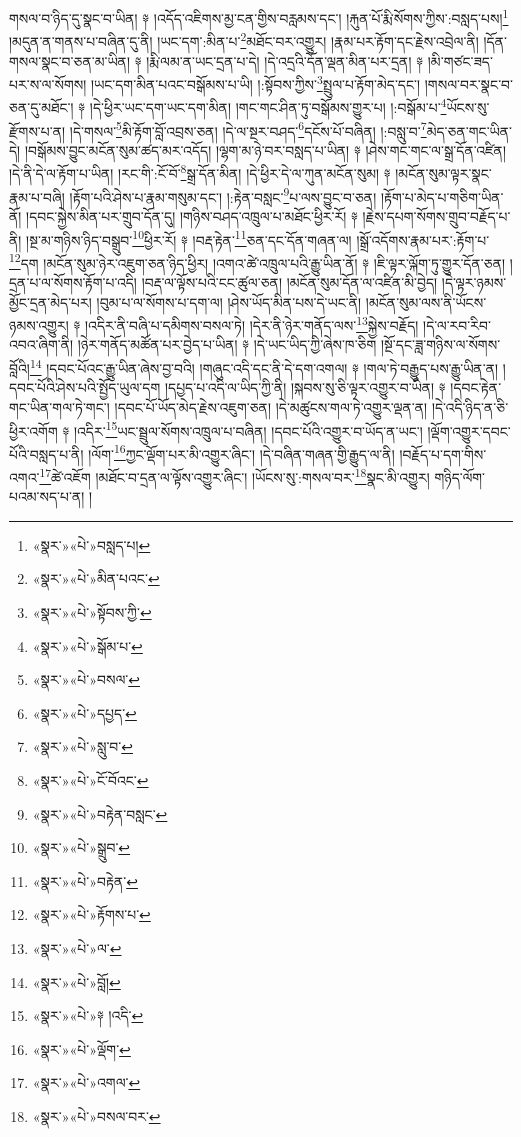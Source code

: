 གསལ་བ་ཉིད་དུ་སྣང་བ་ཡིན། ༈ །འདོད་འཇིགས་མྱ་ངན་གྱིས་བརླམས་དང་། །རྐུན་པོ་རྨི་སོགས་ཀྱིས་:བསླད་པས།\footnote{«སྣར་»«པེ་»བསླད་པ།} །མདུན་ན་གནས་པ་བཞིན་དུ་ནི། །ཡང་དག་:མིན་པ་\footnote{«སྣར་»«པེ་»མིན་པའང་}མཐོང་བར་འགྱུར། །རྣམ་པར་རྟོག་དང་རྗེས་འབྲེལ་ནི། །དོན་གསལ་སྣང་བ་ཅན་མ་ཡིན། ༈ །རྨི་ལམ་ན་ཡང་དྲན་པ་དེ། །དེ་འདྲའི་དོན་ལྡན་མིན་པར་དྲན། ༈ །མི་གཙང་ཟད་པར་ས་ལ་སོགས། །ཡང་དག་མིན་པའང་བསྒོམས་པ་ཡི། །:སྟོབས་ཀྱིས་\footnote{«སྣར་»«པེ་»སྟོབས་ཀྱི་}སྤྲུལ་པ་རྟོག་མེད་དང་། །གསལ་བར་སྣང་བ་ཅན་དུ་མཐོང་། ༈ །དེ་ཕྱིར་ཡང་དག་ཡང་དག་མིན། །གང་གང་ཤིན་ཏུ་བསྒོམས་གྱུར་པ། །:བསྒོམ་པ་\footnote{«སྣར་»«པེ་»སྒོམ་པ་}ཡོངས་སུ་རྫོགས་པ་ན། །དེ་གསལ་\footnote{«སྣར་»«པེ་»བསལ་}མི་རྟོག་བློ་འབྲས་ཅན། །དེ་ལ་སྔར་བཤད་\footnote{«སྣར་»«པེ་»དཔྱད་}དངོས་པོ་བཞིན། །:བསླུ་བ་\footnote{«སྣར་»«པེ་»སླུ་བ་}མེད་ཅན་གང་ཡིན་དེ། །བསྒོམས་བྱུང་མངོན་སུམ་ཚད་མར་འདོད། །ལྷག་མ་ཉེ་བར་བསླད་པ་ཡིན། ༈ །ཤེས་གང་གང་ལ་སྒྲ་དོན་འཛིན། །དེ་ནི་དེ་ལ་རྟོག་པ་ཡིན། །རང་གི་:ངོ་བོ་\footnote{«སྣར་»«པེ་»ངོ་བོའང་}སྒྲ་དོན་མིན། །དེ་ཕྱིར་དེ་ལ་ཀུན་མངོན་སུམ། ༈ །མངོན་སུམ་ལྟར་སྣང་རྣམ་པ་བཞི། །རྟོག་པའི་ཤེས་པ་རྣམ་གསུམ་དང་། །:རྟེན་བསླང་\footnote{«སྣར་»«པེ་»བརྟེན་བསླང་}པ་ལས་བྱུང་བ་ཅན། །རྟོག་པ་མེད་པ་གཅིག་ཡིན་ནོ། །དབང་སྐྱེས་མིན་པར་གྲུབ་དོན་དུ། །གཉིས་བཤད་འཁྲུལ་པ་མཐོང་ཕྱིར་རོ། ༈ །རྗེས་དཔག་སོགས་གྲུབ་བརྗོད་པ་ནི། །སྔ་མ་གཉིས་ཉིད་བསྒྲུབ་\footnote{«སྣར་»«པེ་»སྒྲུབ་}ཕྱིར་རོ། ༈ །བརྡ་རྟེན་\footnote{«སྣར་»«པེ་»བརྟེན་}ཅན་དང་དོན་གཞན་ལ། །སྒྲོ་འདོགས་རྣམ་པར་:རྟོག་པ་\footnote{«སྣར་»«པེ་»རྟོགས་པ་}དག །མངོན་སུམ་ཉེར་འཇུག་ཅན་ཉིད་ཕྱིར། །འགའ་ཚེ་འཁྲུལ་པའི་རྒྱུ་ཡིན་ནོ། ༈ །ཇི་ལྟར་ལྐོག་ཏུ་གྱུར་དོན་ཅན། །དྲན་པ་ལ་སོགས་རྟོག་པ་འདི། །བརྡ་ལ་ལྟོས་པའི་ངང་ཚུལ་ཅན། །མངོན་སུམ་དོན་ལ་འཛིན་མི་བྱེད། །དེ་ལྟར་ཉམས་མྱོང་དྲན་མེད་པར། །བུམ་པ་ལ་སོགས་པ་དག་ལ། །ཤེས་ཡོད་མིན་པས་དེ་ཡང་ནི། །མངོན་སུམ་ལས་ནི་ཡོངས་ཉམས་འགྱུར། ༈ །འདིར་ནི་བཞི་པ་དམིགས་བསལ་ཏེ། །དེར་ནི་ཉེར་གནོད་ལས་\footnote{«སྣར་»«པེ་»ལ་}སྐྱེས་བརྗོད། །དེ་ལ་རབ་རིབ་འབའ་ཞིག་ནི། །ཉེར་གནོད་མཚོན་པར་བྱེད་པ་ཡིན། ༈ །དེ་ཡང་ཡིད་ཀྱི་ཞེས་ཁ་ཅིག །སྔོ་དང་ཟླ་གཉིས་ལ་སོགས་བློའི།\footnote{«སྣར་»«པེ་»བློ།} །དབང་པོའང་རྒྱུ་ཡིན་ཞེས་བྱ་བའི། །གཞུང་འདི་དང་ནི་དེ་དག་འགལ། ༈ །གལ་ཏེ་བརྒྱུད་པས་རྒྱུ་ཡིན་ན། །དབང་པོའི་ཤེས་པའི་སྤྱོད་ཡུལ་དག །དཔྱད་པ་འདི་ལ་ཡིད་ཀྱི་ནི། །སྐབས་སུ་ཅི་ལྟར་འགྱུར་བ་ཡིན། ༈ །དབང་རྟེན་གང་ཡིན་གལ་ཏེ་གང་། །དབང་པོ་ཡོད་མེད་རྗེས་འཇུག་ཅན། །དེ་མཚུངས་གལ་ཏེ་འགྱུར་ལྡན་ན། །དེ་འདི་ཉིད་ན་ཅི་ཕྱིར་འགོག ༈ །འདིར་\footnote{«སྣར་»«པེ་»༈ །འདི་}ཡང་སྦྲུལ་སོགས་འཁྲུལ་པ་བཞིན། །དབང་པོའི་འགྱུར་བ་ཡོད་ན་ཡང་། །ལྡོག་འགྱུར་དབང་པོའི་བསླད་པ་ནི། །ལོག་\footnote{«སྣར་»«པེ་»ལྡོག་}ཀྱང་ལྡོག་པར་མི་འགྱུར་ཞིང་། །དེ་བཞིན་གཞན་གྱི་རྒྱུད་ལ་ནི། །བརྗོད་པ་དག་གིས་འགའ་\footnote{«སྣར་»«པེ་»འགལ་}ཚེ་འཇོག །མཐོང་བ་དྲན་ལ་ལྟོས་འགྱུར་ཞིང་། །ཡོངས་སུ་:གསལ་བར་\footnote{«སྣར་»«པེ་»བསལ་བར་}སྣང་མི་འགྱུར། གཉིད་ལོག་པའམ་སད་པ་ན། །
